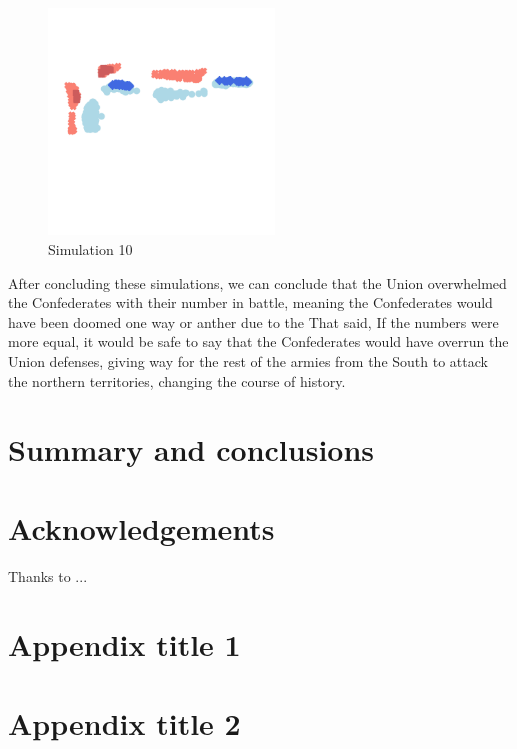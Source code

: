 \documentclass[final,5p,times,twocolumn,authoryear]{elsarticle}
\begin{document}
\begin{figure}[!ht]
  \centering
      \includegraphics[width=6cm]{Battle_3.png}
      \caption{Simulation 10}
      \label{fig:Simulation}
  \centering
\end{figure}


After concluding these simulations, we can conclude that the Union overwhelmed the Confederates with their number in battle, meaning the Confederates would have been doomed one way or anther due to the That said, If the numbers were more equal, it would be safe to say that the Confederates would have overrun the Union defenses, giving way for the rest of the armies from the South to attack the northern territories, changing the course of history.


\section{Summary and conclusions}
\lipsum[1-4]


\section*{Acknowledgements}
Thanks to ...

\appendix

\section{Appendix title 1}

\section{Appendix title 2}

 







\end{document}
